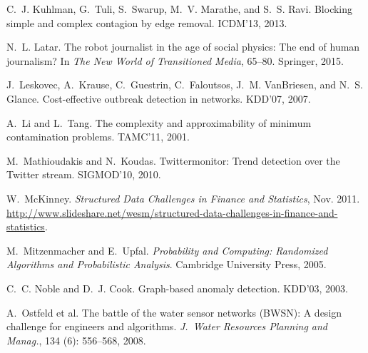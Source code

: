\begin{thebibliography}{41}
C.~J. Kuhlman, G.~Tuli, S.~Swarup, M.~V. Marathe, and S.~S. Ravi.
\newblock Blocking simple and complex contagion by edge removal.
\newblock ICDM'13, 2013.

N.~L. Latar.
\newblock The robot journalist in the age of social physics: The end of human
  journalism?
\newblock In \emph{The New World of Transitioned Media}, 65--80.
  Springer, 2015.

J.~Leskovec, A.~Krause, C.~Guestrin, C.~Faloutsos, J.~M. VanBriesen, and N.~S.
  Glance.
\newblock Cost-effective outbreak detection in networks.
\newblock KDD'07, 2007.

A.~Li and L.~Tang.
\newblock The complexity and approximability of minimum contamination problems.
\newblock TAMC'11, 2001.

M.~Mathioudakis and N.~Koudas.
\newblock Twittermonitor: Trend detection over the {T}witter stream.
\newblock SIGMOD'10, 2010.

W.~McKinney.
\newblock \emph{Structured Data Challenges in Finance and Statistics}, Nov.
  2011.
\newblock
  \url{http://www.slideshare.net/wesm/structured-data-challenges-in-finance-and-statistics}.

M.~Mitzenmacher and E.~Upfal.
\newblock \emph{Probability and Computing: Randomized Algorithms and
  Probabilistic Analysis}.
\newblock Cambridge University Press, 2005.

C.~C. Noble and D.~J. Cook.
\newblock Graph-based anomaly detection.
\newblock KDD'03, 2003.

A.~Ostfeld et al.
\newblock The battle of the water sensor networks ({BWSN}): A design challenge
  for engineers and algorithms.
\newblock \emph{J.~Water Resources Planning and Manag.},
  134 (6): 556--568, 2008.


\end{thebibliography}
